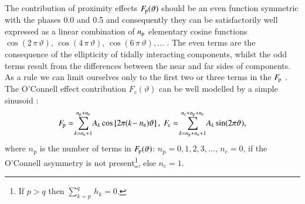 \documentclass{aa}
\newcommand{\hzav}[1]{\left[#1\right]}
\begin{document}
The contribution of proximity effects $F\!_{\rm p}(\vartheta)$ should be an even function symmetric with the phases 0.0 and 0.5 and consequently they can be satisfactorily well expressed as a linear combination of $n_{\rm p}$ elementary cosine functions $\cos(2\,\pi\,\vartheta),\,\cos(4\,\pi\,\vartheta),\,\cos(6\,\pi\,\vartheta),\ldots $ . The even terms are the consequence of the ellipticity of tidally interacting components, whilst the odd terms result from the differences between the near and far sides of components. As a rule we can limit ourselves only to the first two or three terms in the $F\!_{\rm{p}}$ \citep{rusmer,kalmil}.  The O'Connell effect contribution $F_c(\vartheta)$  can be well modelled by a simple sinusoid \citep{davmil,wilsey}:
\begin{equation}\label{proxcon}
 F\!_{\rm p} =\!\sum_{k=n_{\mathrm e}+1}^{n_{\mathrm p}+
n_{\mathrm e}}\! A_k\cos\hzav{2\pi(k\!-n_{\mathrm e})\vartheta},\
  F\!_{\rm c}=\!\sum_{k=n_{\mathrm p}+n_{\mathrm e}+1}^{n_{\mathrm c}+
n_{\mathrm p}+n_{\mathrm e}}\! A_k\sin(2\pi\vartheta),
\end{equation}
where $n_{\mathrm p}$ is the number of terms in $F\!_{\rm p}(\vartheta)$: $n_{\mathrm p}=0,1,2,3,\ldots$, $n_{\mathrm c}=0$, if the O'Connell asymmetry is not present\footnote{If $p>q$ then $\sum_{k=p}^q\,h_k=0.$}, else $n_{\mathrm c}=1$.
\end{document}
